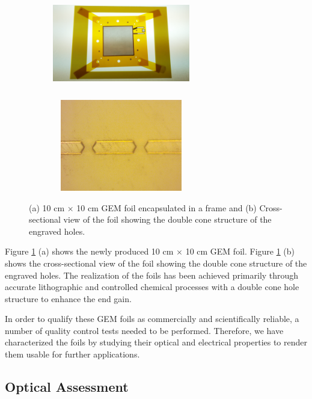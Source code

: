 \begin{figure}[!htbp]
    \centering
    \begin{subfigure}[b]{0.46\textwidth}
        \includegraphics[width=6cm, height=4cm]{figures/GEM/figures/Foil_01.png}\qquad
        \caption{ }
    \end{subfigure}
    \begin{subfigure}[b]{0.46\textwidth}
        \includegraphics[width=6cm, height=4cm]{figures/GEM/figures/double_cone.png}
        \caption{ }
    \end{subfigure}
   \caption{(a) 10 cm $\times$ 10 cm GEM foil encapsulated in a frame and (b) Cross-sectional view of the foil showing the double cone structure of the engraved holes. } \label{fig:Foil_and_Cone}
\end{figure}

Figure \ref{fig:Foil_and_Cone} (a) shows the newly produced 10 cm $\times$ 10 cm GEM foil. Figure \ref{fig:Foil_and_Cone} (b) shows the cross-sectional view of the foil showing the double cone structure of the engraved holes. The realization of the foils has been achieved primarily through accurate lithographic and controlled chemical processes with a double cone hole structure to enhance the end gain.

In order to qualify these GEM foils as commercially and scientifically reliable, a number of quality control tests needed to be performed. Therefore, we have characterized the foils by studying their optical and electrical properties to render them usable for further applications.
\subsection{Optical Assessment}


